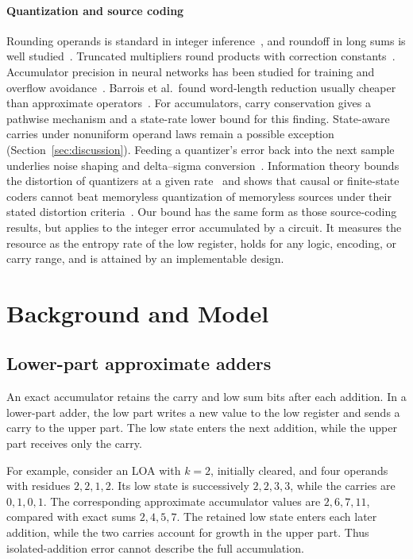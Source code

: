 \documentclass[preprint,12pt,numbers]{elsarticle}
\theoremstyle{definition}
\begin{document}
\paragraph{Quantization and source coding}
Rounding operands is standard in integer inference~\cite{jacob2018quant},
and roundoff in long sums is well studied~\cite{widrow2008,connolly2021sr}.
Truncated multipliers round products with correction
constants~\cite{schulte1993trunc,king1997trunc,petra2010trunc}. Accumulator
precision in neural networks has been studied for training and overflow
avoidance~\cite{sakr2019accum,colbert2023a2q,lin2016fxp}. Barrois et al.\
found word-length reduction usually cheaper than approximate
operators~\cite{barrois2017hidden}. For accumulators, carry conservation
gives a pathwise mechanism and a state-rate lower bound for this finding.
State-aware carries under nonuniform operand laws remain a possible exception
(Section~\ref{sec:discussion}). Feeding a quantizer's error back into the next
sample underlies noise shaping and delta--sigma
conversion~\cite{spang1962,norsworthy1997}. Information theory bounds the
distortion of quantizers at a given rate~\cite{gray1998quant} and shows that
causal or finite-state coders cannot beat memoryless quantization of
memoryless sources under their stated distortion
criteria~\cite{witsenhausen1979,neuhoff1982causal,gaarder1982}. Our
bound has the same form as those source-coding results, but applies to
the integer error accumulated by a circuit. It measures the resource as
the entropy rate of the low register, holds for any logic, encoding, or
carry range, and is attained by an implementable design.

\section{Background and Model}
\label{sec:model}

\subsection{Lower-part approximate adders}

An exact accumulator retains the carry and low sum bits after each addition.
In a lower-part adder, the low part writes a new value to the low register
and sends a carry to the upper part. The low state enters the next
addition, while the upper part receives only the carry.

For example, consider an LOA with $k=2$, initially cleared, and four
operands with residues $2,2,1,2$. Its low state is successively
$2,2,3,3$, while the carries are $0,1,0,1$. The corresponding approximate
accumulator values are $2,6,7,11$, compared with exact sums $2,4,5,7$.
The retained low state enters each later addition, while the two carries
account for growth in the upper part. Thus isolated-addition error
cannot describe the full accumulation.
\end{document}
